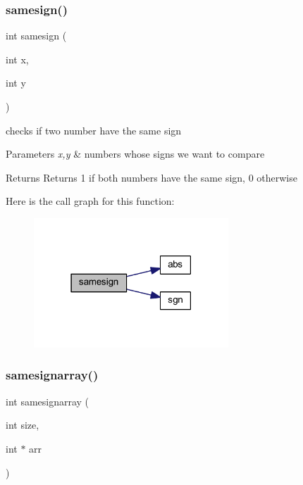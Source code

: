 \subsubsection{\texorpdfstring{samesign()}{samesign()}}
{\footnotesize\ttfamily int samesign (\begin{DoxyParamCaption}\item[{int}]{x,  }\item[{int}]{y }\end{DoxyParamCaption})}



checks if two number have the same sign 


\begin{DoxyParams}{Parameters}
{\em x,y} & numbers whose signs we want to compare \\
\hline
\end{DoxyParams}
\begin{DoxyReturn}{Returns}
Returns 1 if both numbers have the same sign, 0 otherwise 
\end{DoxyReturn}
Here is the call graph for this function\+:\nopagebreak
\begin{figure}[H]
\begin{center}
\leavevmode
\includegraphics[width=207pt]{group__utilities_ga92a937ad6b303c03cc98f5fe9354d235_cgraph}
\end{center}
\end{figure}
\hypertarget{group__utilities_ga75e5e4e3c99b54b12f0bb43becded2d1}{}\label{group__utilities_ga75e5e4e3c99b54b12f0bb43becded2d1} 
\subsubsection{\texorpdfstring{samesignarray()}{samesignarray()}}
{\footnotesize\ttfamily int samesignarray (\begin{DoxyParamCaption}\item[{int}]{size,  }\item[{int $\ast$}]{arr }\end{DoxyParamCaption})}



